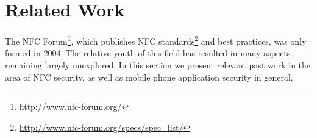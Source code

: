 \documentclass[12pt]{article}
\newcommand\TODO[1]{\textcolor{red}{#1}}
\begin{document}
%
%
%

\section{Related Work}
The NFC Forum\footnote{\url{http://www.nfc-forum.org/}}, which publishes NFC standards\footnote{\url{http://www.nfc-forum.org/specs/spec_list/}} and best practices, was only formed in 2004.
The relative youth of this field has resulted in many aspects remaining largely unexplored.
In this section we present relevant past work in the area of NFC security, as well as mobile phone application security in general.
\end{document}
